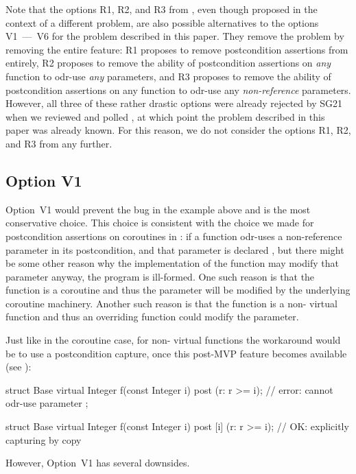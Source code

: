 Note that the options R1, R2, and R3 from \cite{P3487R0}, even though proposed in the context of a different problem,  are also possible alternatives to the options V1~---~V6 for the problem described in this paper. They remove the problem by removing the entire feature: R1 proposes to remove postcondition assertions from \cite{P2900R10} entirely, R2 proposes to remove the ability of postcondition assertions on \emph{any} function to odr-use \emph{any} parameters, and R3 proposes to remove the ability of postcondition assertions on any function to odr-use any \emph{non-reference} parameters. However, all three of these rather drastic options were already rejected by SG21 when we reviewed and polled \cite{P3487R0}, at which point the problem described in this paper was already known. For this reason, we do not consider the options R1, R2, and R3 from \cite{P3487R0} any further.

\subsection*{Option V1}

Option~V1 would prevent the bug in the example above and is the most conservative choice. This choice is consistent with the choice we made for postcondition assertions on coroutines in \cite{P2900R10}: if a function odr-uses a non-reference parameter in its postcondition, and that parameter is declared , but there might be some other reason why the implementation of the function may modify that parameter anyway, the program is ill-formed. One such reason is that the function is a coroutine and thus the parameter will be modified by the underlying coroutine machinery. Another such reason is that the function is a non- virtual function and thus an overriding function could modify the parameter.

Just like in the coroutine case, for non- virtual functions the workaround would be to use a postcondition capture, once this post-MVP feature becomes available (see \cite{P3098R0}):
\begin{codeblock}
struct Base {
  virtual Integer f(const Integer i) post (r: r >= i);     // error: cannot odr-use parameter  
};

struct Base {
  virtual Integer f(const Integer i) post [i] (r: r >= i); // OK: explicitly capturing  by copy
}
\end{codeblock}

However, Option~V1 has several downsides.

